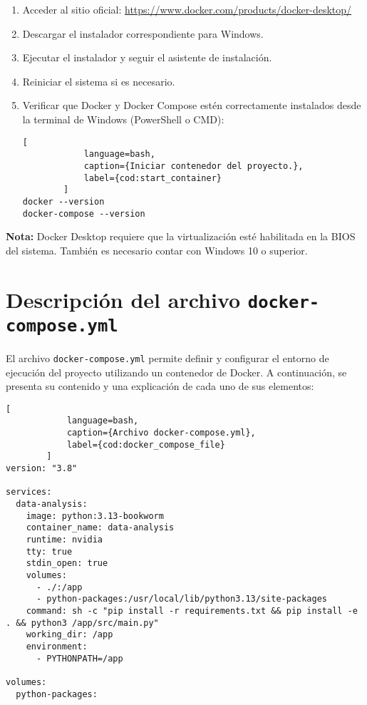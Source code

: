 \begin{enumerate}
    \item Acceder al sitio oficial: \href{https://www.docker.com/products/docker-desktop/}{https://www.docker.com/products/docker-desktop/}
    
    \item Descargar el instalador correspondiente para Windows.

    \item Ejecutar el instalador y seguir el asistente de instalación.

    \item Reiniciar el sistema si es necesario.

    \item Verificar que Docker y Docker Compose estén correctamente instalados desde la terminal de Windows (PowerShell o CMD):
    \begin{lstlisting}[
			language=bash,
			caption={Iniciar contenedor del proyecto.},
			label={cod:start_container}
		]
docker --version
docker-compose --version
    \end{lstlisting}
\end{enumerate}

\textbf{Nota:} Docker Desktop requiere que la virtualización esté habilitada en la BIOS del sistema. También es necesario contar con Windows 10 o superior.

\section{Descripción del archivo \texttt{docker-compose.yml}}
El archivo \texttt{docker-compose.yml} permite definir y configurar el entorno de ejecución del proyecto utilizando un contenedor de Docker. A continuación, se presenta su contenido y una explicación de cada uno de sus elementos:

\vspace{3mm}
\begin{lstlisting}[
			language=bash,
			caption={Archivo docker-compose.yml},
			label={cod:docker_compose_file}
		]
version: "3.8"

services:
  data-analysis:
    image: python:3.13-bookworm
    container_name: data-analysis
    runtime: nvidia
    tty: true
    stdin_open: true
    volumes:
      - ./:/app
      - python-packages:/usr/local/lib/python3.13/site-packages
    command: sh -c "pip install -r requirements.txt && pip install -e . && python3 /app/src/main.py"
    working_dir: /app
    environment:
      - PYTHONPATH=/app

volumes:
  python-packages:
\end{lstlisting}


